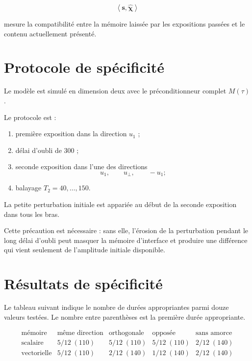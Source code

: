 \[
\left\langle
\boldsymbol s,
\widehat{\boldsymbol\chi}
\right\rangle
\]

mesure la compatibilité entre la mémoire laissée par les expositions
passées et le contenu actuellement présenté.

\section{Protocole de spécificité}
\label{annexe-num-protocole-specificite}

Le modèle est simulé en dimension deux avec le préconditionneur complet
\(M(\tau)\).

Le protocole est :

\begin{enumerate}
\item première exposition dans la direction \(u_1\) ;
\item délai d'oubli de \(300\) ;
\item seconde exposition dans l'une des directions
  \[
  u_1,
  \qquad
  u_\perp,
  \qquad
  -u_1;
  \]
\item balayage \(T_2=40,\ldots,150\).
\end{enumerate}

La petite perturbation initiale est appariée au début de la seconde
exposition dans tous les bras.

Cette précaution est nécessaire : sans elle, l'érosion de la
perturbation pendant le long délai d'oubli peut masquer la mémoire
d'interface et produire une différence qui vient seulement de
l'amplitude initiale disponible.

\section{Résultats de spécificité}
\label{annexe-num-resultats-specificite}

Le tableau suivant indique le nombre de durées appropriantes parmi
douze valeurs testées. Le nombre entre parenthèses est la première
durée appropriante.

\[
\begin{array}{l|cccc}
\text{mémoire}
&
\text{même direction}
&
\text{orthogonale}
&
\text{opposée}
&
\text{sans amorce}
\\
\hline
\text{scalaire}
&5/12\;(110)
&5/12\;(110)
&5/12\;(110)
&2/12\;(140)
\\
\text{vectorielle}
&5/12\;(110)
&2/12\;(140)
&1/12\;(140)
&2/12\;(140)
\end{array}
\]

